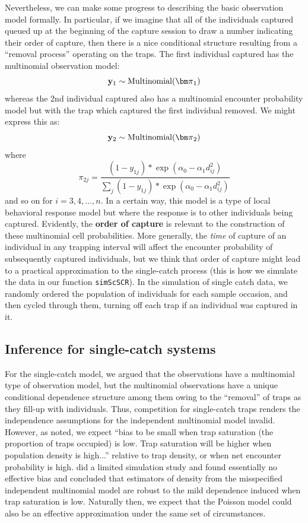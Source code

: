 Nevertheless, we can make some progress to describing the basic
observation model formally. In particular, if we imagine that all of
the individuals captured queued up at the beginning of the capture
session to draw a number indicating their order of capture, then there
is a nice conditional structure resulting from a ``removal process''
operating on the traps.  The first individual captured has the
multinomial observation model:
\[
{\bf y}_{1} \sim \mbox{Multinomial}({\bm \pi}_{1})
\]
whereas the 2nd individual captured also has a multinomial encounter
probability model but with the trap which captured the first
individual removed. We might express this as:
\[
{\bf y}_{2} \sim \mbox{Multinomial}({\bm \pi}_{2})
\]
where
\[
 \pi_{2j}  = \frac{ (1-y_{1j}) * \exp( \alpha_{0} - \alpha_{1}   d_{ij}^{2}) }
{ \sum_{j} (1-y_{1j}) * \exp( \alpha_{0} - \alpha_{1}   d_{ij}^{2}) }
\]
and so on for $i=3,4,\ldots,n$.  In a certain way, this model is a
type of local behavioral response model but where the response is to
other individuals being captured.  Evidently, the {\bf order of
  capture} is relevant to the construction of these multinomial cell
probabilities. More generally, the {\it time} of capture of an
individual in any trapping interval will affect the encounter
probability of subsequently captured individuals, but we think
that %
order of capture might lead to a practical approximation to the
single-catch process (this is how we simulate the data in our function
\mbox{\tt simScSCR}).
In the
simulation of single catch data, we randomly ordered the population of
individuals for each sample occasion,
and then cycled through them, turning off each trap if an individual
was captured in it.


\subsection{Inference for single-catch systems}

For the single-catch model, we argued that the observations have a
multinomial type of observation model, but the multinomial
observations have a unique conditional dependence structure among them
owing to the ``removal'' of traps as they fill-up with individuals.
Thus, competition for single-catch traps renders the independence
assumptions for the independent multinomial model invalid.  However,
as \citet{efford_etal:2009euring} noted, we expect ``bias to be small
when trap saturation (the proportion of traps occupied) is low.  Trap
saturation will be higher when population density is high...''
relative to trap density, or when net encounter probability is high.
\citet{efford_etal:2009euring} did a limited simulation study and
found essentially no effective bias and concluded that estimators of
density from the misspecified independent multinomial model are robust
to the mild dependence induced when trap saturation is low.  Naturally
then, we expect that the Poisson model could also be an effective
approximation under the same set of circumstances.

